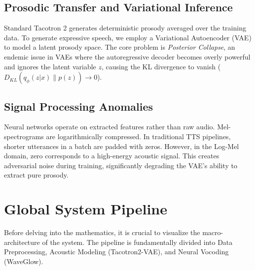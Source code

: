 \documentclass[12pt]{article}
\begin{document}
\subsection{Prosodic Transfer and Variational Inference}
Standard Tacotron 2 generates deterministic prosody averaged over the training data. To generate expressive speech, we employ a Variational Autoencoder (VAE) to model a latent prosody space. The core problem is \textit{Posterior Collapse}, an endemic issue in VAEs where the autoregressive decoder becomes overly powerful and ignores the latent variable $z$, causing the KL divergence to vanish ($D_{KL}(q_\phi(z|x) \| p(z)) \to 0$).

\subsection{Signal Processing Anomalies}
Neural networks operate on extracted features rather than raw audio. Mel-spectrograms are logarithmically compressed. In traditional TTS pipelines, shorter utterances in a batch are padded with zeros. However, in the Log-Mel domain, zero corresponds to a high-energy acoustic signal. This creates adversarial noise during training, significantly degrading the VAE's ability to extract pure prosody.

\section{Global System Pipeline}

Before delving into the mathematics, it is crucial to visualize the macro-architecture of the system. The pipeline is fundamentally divided into Data Preprocessing, Acoustic Modeling (Tacotron2-VAE), and Neural Vocoding (WaveGlow).
\end{document}
